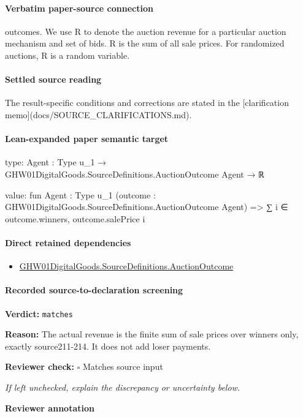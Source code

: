 \documentclass[10pt]{article}
\newcommand{\reviewerbox}{%
  \par\noindent\fbox{\parbox{0.96\linewidth}{\rule{0pt}{0.38in}}}\par
}
\newcommand{\reviewmatch}[1]{%
  \par\noindent\textbf{Reviewer check:} $\square$\; #1\par
  \noindent\emph{If left unchecked, explain the discrepancy or uncertainty below.}\par
}
\begin{document}
\paragraph{Verbatim paper-source connection}
\begin{ReviewVerbatim}
outcomes. We use R to denote the auction revenue
for a particular auction mechanism and set of bids. R
is the sum of all sale prices. For randomized auctions,
R is a random variable.
\end{ReviewVerbatim}

\paragraph{Settled source reading}
\begin{sloppypar}
The result-\allowbreak{}specific conditions and corrections are stated in the [clarification memo](docs/\allowbreak{}SOURCE\_\allowbreak{}CLARIFICATIONS.\allowbreak{}md).\allowbreak{}
\end{sloppypar}

\paragraph{Lean-expanded paper semantic target}
\begin{ReviewVerbatim}
type:
{Agent : Type u_1} → GHW01DigitalGoods.SourceDefinitions.AuctionOutcome Agent → ℝ

value:
fun {Agent : Type u_1} (outcome : GHW01DigitalGoods.SourceDefinitions.AuctionOutcome Agent) =>
  ∑ i ∈ outcome.winners, outcome.salePrice i
\end{ReviewVerbatim}

\paragraph{Direct retained dependencies}
\begin{itemize}\raggedright
\item \hyperlink{paper-prerequisite-fc173e8d557afd08}{GHW01\allowbreak{}Digital\allowbreak{}Goods.\allowbreak{}Source\allowbreak{}Definitions.\allowbreak{}Auction\allowbreak{}Outcome}
\end{itemize}
\paragraph{Recorded source-to-declaration screening}
\textbf{Verdict:} \texttt{matches}
\\
{\raggedright
\textbf{Reason:} The actual revenue is the finite sum of sale prices over winners only, exactly source211-\allowbreak{}214.\allowbreak{} It does not add loser payments.\allowbreak{}
\par}
\reviewmatch{Matches source input}
\noindent\textbf{Reviewer annotation}\par
\reviewerbox
\clearpage
\hypertarget{paper-prerequisite-11769b7a8f4d665e}{}
\end{document}
